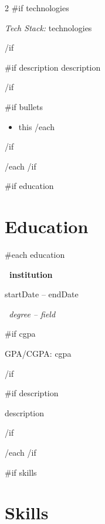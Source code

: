 \documentclass[10pt,a4paper]{article}
\begin{document}
\begin{paracol}{2}
{{#if technologies}}
\vspace{2pt}
{\small\color{muted}
\textit{Tech Stack:} {{technologies}}\par}
\vspace{3pt}
{{/if}}


{{#if description}}
\vspace{1pt}
{{description}}
\par
{{/if}}

{{#if bullets}}
\begin{itemize}
{{#each bullets}}
    \item {{this}}
{{/each}}
\end{itemize}
{{/if}}

\vspace{3pt}

{{/each}}
{{/if}}


\switchcolumn


{{#if education}}
\section{Education}

{{#each education}}

\textbf{ {{~institution~}} }\par

{\small\color{muted}
{{startDate}} -- {{endDate}}\par}

\vspace{1pt}

\textit{ {{~degree}} -- {{field~}} }\par

{{#if cgpa}}
{\small GPA/CGPA: {{cgpa}}\par}
{{/if}}

{{#if description}}
{\small {{description}}\par}
{{/if}}

\vspace{4pt}

{{/each}}
{{/if}}


{{#if skills}}
\section{Skills}


\end{paracol}
\end{document}
